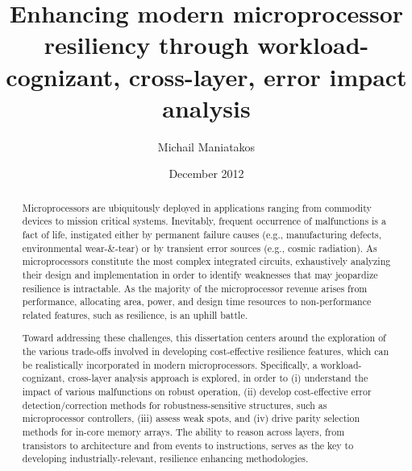 \documentclass[12pt]{rockefeller}
\begin{document}
\author{Michail Maniatakos}
\title{Enhancing modern microprocessor resiliency through workload-cognizant, cross-layer, error impact analysis}
\date{December 2012}

\maketitle

\begin{abstract}

Microprocessors are ubiquitously deployed in applications ranging from commodity devices to mission critical systems. Inevitably, frequent occurrence of malfunctions is a fact of life, instigated either by permanent failure causes (e.g., manufacturing defects, environmental wear-\&-tear) or by transient error sources (e.g., cosmic radiation). As microprocessors constitute the most complex integrated circuits, exhaustively analyzing their design and implementation in order to identify weaknesses that may jeopardize resilience is intractable. As the majority of the microprocessor revenue arises from performance, allocating area, power, and design time resources to non-performance related features, such as resilience, is an uphill battle.

Toward addressing these challenges, this dissertation centers around the exploration of the various trade-offs involved in developing cost-effective resilience features, which can be realistically incorporated in modern microprocessors. Specifically, a workload-cognizant, cross-layer analysis approach is explored, in order to (i) understand the impact of various malfunctions on robust operation, (ii) develop cost-effective error detection/correction methods for robustness-sensitive structures, such as microprocessor controllers, (iii) assess weak spots, and (iv) drive parity selection methods for in-core memory arrays.  The ability to reason across layers, from transistors to architecture and from events to instructions, serves as the key to developing industrially-relevant, resilience enhancing methodologies.

\end{abstract}


\tableofcontents

\listoffigures

\listoftables
\end{document}

